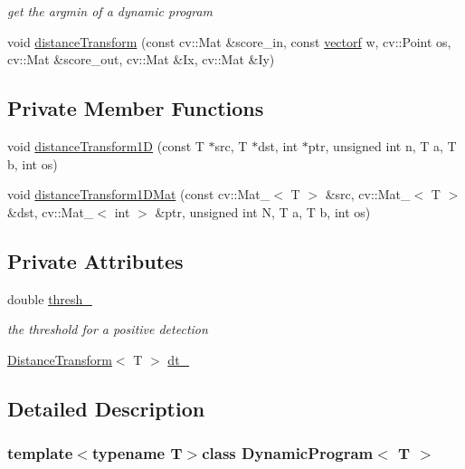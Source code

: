 \begin{DoxyCompactItemize}
\begin{DoxyCompactList}\small\item\em get the argmin of a dynamic program \end{DoxyCompactList}\item 
void \hyperlink{classDynamicProgram_a9de6aa6cd756dee7e9c060b354c59f73}{distance\-Transform} (const cv\-::\-Mat \&score\-\_\-in, const \hyperlink{types_8hpp_a4da5db3ee9e284f719ef5764dbadffc8}{vectorf} w, cv\-::\-Point os, cv\-::\-Mat \&score\-\_\-out, cv\-::\-Mat \&Ix, cv\-::\-Mat \&Iy)
\end{DoxyCompactItemize}
\subsection*{Private Member Functions}
\begin{DoxyCompactItemize}
\item 
void \hyperlink{classDynamicProgram_a817c1423f8b0ca6241a400bdbc4ec575}{distance\-Transform1\-D} (const T $\ast$src, T $\ast$dst, int $\ast$ptr, unsigned int n, T a, T b, int os)
\item 
void \hyperlink{classDynamicProgram_aa8d6acb9b187ef74712b4d5993507fbc}{distance\-Transform1\-D\-Mat} (const cv\-::\-Mat\-\_\-$<$ T $>$ \&src, cv\-::\-Mat\-\_\-$<$ T $>$ \&dst, cv\-::\-Mat\-\_\-$<$ int $>$ \&ptr, unsigned int N, T a, T b, int os)
\end{DoxyCompactItemize}
\subsection*{Private Attributes}
\begin{DoxyCompactItemize}
\item 
double \hyperlink{classDynamicProgram_a08f2d4801faa0f964e217b9ac9927ec6}{thresh\-\_\-}
\begin{DoxyCompactList}\small\item\em the threshold for a positive detection \end{DoxyCompactList}\item 
\hyperlink{classDistanceTransform}{Distance\-Transform}$<$ T $>$ \hyperlink{classDynamicProgram_a6cea0b8559d6a03d81e2003991ab67cf}{dt\-\_\-}
\end{DoxyCompactItemize}


\subsection{Detailed Description}
\subsubsection*{template$<$typename T$>$class Dynamic\-Program$<$ T $>$}

